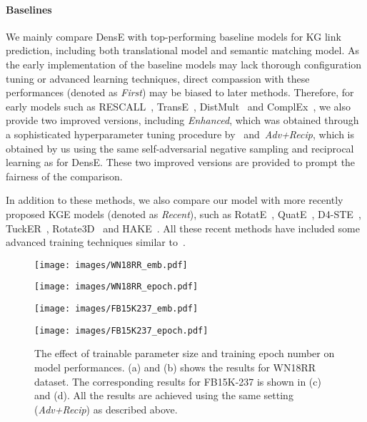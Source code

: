 \documentclass[11pt]{article}
\begin{document}
 
\paragraph{Baselines} We mainly compare DensE with top-performing baseline models for KG link prediction, including both translational model and semantic matching model. As the early implementation of the baseline models may lack thorough configuration tuning or advanced learning techniques, direct compassion with these performances (denoted as \textit{First}) may be biased to later methods. Therefore, for early models such as RESCALL~\cite{nickel2011three}, TransE~\cite{bordes2013translating}, DistMult~\cite{yang2014embedding} and ComplEx~\cite{trouillon2016complex}, we also provide two improved versions, including \textit{Enhanced}, which was obtained through a sophisticated hyperparameter tuning procedure by~\cite{ruffinelli2019you} and~\textit{Adv+Recip}, which is obtained by us using the same self-adversarial negative sampling and reciprocal learning as for DensE. These two improved versions are provided to prompt the fairness of the comparison. 


In addition to these methods, we also compare our model with more recently proposed KGE models (denoted as \textit{Recent}), such as RotatE~\cite{sun2019rotate}, QuatE~\cite{jia2019quaternions}, D4-STE~\cite{xu2019relation}, TuckER~\cite{balavzevic2019tucker}, Rotate3D~\cite{gao2020rotate3d} and HAKE~\cite{zhang2020learning}. All these recent methods have included some advanced training techniques similar to~\cite{ruffinelli2019you}.  



\begin{figure*}[!ht]
\centering     \begin{minipage}{7cm}
\centering
\texttt{[image: images/WN18RR\_emb.pdf]}
\subcaption{}
\end{minipage}
\begin{minipage}{7cm}
\centering
\texttt{[image: images/WN18RR\_epoch.pdf]}
\subcaption{}
\end{minipage}

\begin{minipage}{7cm}
\centering
\texttt{[image: images/FB15K237\_emb.pdf]}
\subcaption{}
\end{minipage}
\begin{minipage}{7cm}
\centering
\texttt{[image: images/FB15K237\_epoch.pdf]}
\subcaption{}
\end{minipage}


\caption{The effect of trainable parameter size and training epoch number on model performances. (a) and (b) shows the results for WN18RR dataset. The corresponding results for FB15K-237 is shown in (c) and (d). All the results are achieved using the same setting ({\textit{Adv+Recip}}) as described above.}
\label{model_complexity}
\end{figure*}
\end{document}
